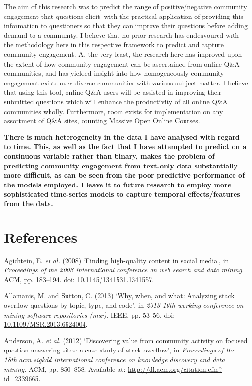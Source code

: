 \documentclass[11pt,preprint, authoryear]{article}
\numberwithin{equation}{section}
\begin{document}
The aim of this research was to predict the range of positive/negative
community engagement that questions elicit, with the practical
application of providing this information to questioners so that they
can improve their questions before adding demand to a community. I
believe that no prior research has endeavoured with the methodology here
in this respective framework to predict and capture community
engagement. At the very least, the research here has improved upon the
extent of how community engagement can be ascertained from online Q\&A
communities, and has yielded insight into how homogeneously community
engagement exists over diverse communities with various subject matter.
I believe that using this tool, online Q\&A users will be assisted in
improving their submitted questions which will enhance the productivity
of all online Q\&A communities wholly. Furthermore, room exists for
implementation on any assortment of Q\&A sites, counting Massive Open
Online Courses.

\textbf{There is much heterogeneity in the data I have analysed with
regard to time. This, as well as the fact that I have attempted to
predict on a continuous variable rather than binary, makes the problem
of predicting community engagement from text-only data substantially
more difficult, as can be seen from the poor predictive performance of
the models employed. I leave it to future research to employ more
sophisticated time-series models to capture temporal effects/features
from the data.}

\newpage

\section*{References}

\hypertarget{refs}{}
\hypertarget{ref-Agichtein2008}{}
Agichtein, E. \emph{et al.} (2008) `Finding high-quality content in
social media', in \emph{Proceedings of the 2008 international conference
on web search and data mining}. ACM, pp. 183--194. doi:
\href{https://doi.org/10.1145/1341531.1341557}{10.1145/1341531.1341557}.

\hypertarget{ref-Allamanis2013}{}
Allamanis, M. and Sutton, C. (2013) `Why, when, and what: Analyzing
stack overflow questions by topic, type, and code', in \emph{2013 10th
working conference on mining software repositories (msr)}. IEEE, pp.
53--56. doi:
\href{https://doi.org/10.1109/MSR.2013.6624004}{10.1109/MSR.2013.6624004}.

\hypertarget{ref-Anderson2012}{}
Anderson, A. \emph{et al.} (2012) `Discovering value from community
activity on focused question answering sites: a case study of stack
overflow', in \emph{Proceedings of the 18th acm sigkdd international
conference on knowledge discovery and data mining}. ACM, pp. 850--858.
Available at: \url{http://dl.acm.org/citation.cfm?id=2339665}.
\end{document}
